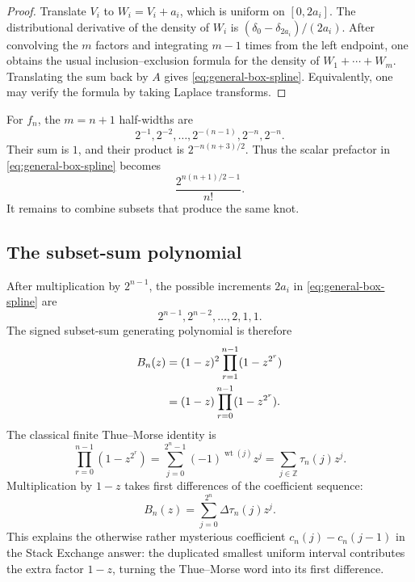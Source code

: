 \documentclass[11pt,oneside]{article}
\theoremstyle{definition}
\theoremstyle{remark}
\newcommand{\wt}{\operatorname{wt}}
\begin{document}
\begin{proof}
Translate $V_i$ to $W_i=V_i+a_i$, which is uniform on $[0,2a_i]$.  The distributional
derivative of the density of $W_i$ is
$(\delta_0-\delta_{2a_i})/(2a_i)$.  After convolving the $m$ factors and integrating
$m-1$ times from the left endpoint, one obtains the usual inclusion--exclusion formula
for the density of $W_1+\cdots+W_m$.  Translating the sum back by $A$ gives
\eqref{eq:general-box-spline}.  Equivalently, one may verify the formula by taking
Laplace transforms.
\end{proof}

For $f_n$, the $m=n+1$ half-widths are
\begin{equation}
 2^{-1},2^{-2},\ldots,2^{-(n-1)},2^{-n},2^{-n}.
 \label{eq:fn-halfwidths}
\end{equation}
Their sum is $1$, and their product is $2^{-n(n+3)/2}$.  Thus the scalar prefactor in
\eqref{eq:general-box-spline} becomes
\begin{equation}
 \frac{2^{n(n+1)/2-1}}{n!}.
 \label{eq:box-prefactor}
\end{equation}
It remains to combine subsets that produce the same knot.

\subsection{The subset-sum polynomial}

After multiplication by $2^{n-1}$, the possible increments $2a_i$ in
\eqref{eq:general-box-spline} are
\begin{equation}
 2^{n-1},2^{n-2},\ldots,2,1,1.
 \label{eq:integer-increments}
\end{equation}
The signed subset-sum generating polynomial is therefore
\begin{align}
 B_n(z)
 &=(1-z)^2\prod_{r=1}^{n-1}(1-z^{2^r}) \notag\\
 &=(1-z)\prod_{r=0}^{n-1}(1-z^{2^r}).
 \label{eq:subset-polynomial}
\end{align}
The classical finite Thue--Morse identity is
\begin{equation}
 \prod_{r=0}^{n-1}(1-z^{2^r})
 =\sum_{j=0}^{2^n-1}(-1)^{\wt(j)}z^j
 =\sum_{j\in\mathbb Z}\tau_n(j)z^j.
 \label{eq:thue-morse-product}
\end{equation}
Multiplication by $1-z$ takes first differences of the coefficient sequence:
\begin{equation}
 B_n(z)=\sum_{j=0}^{2^n}\Delta\tau_n(j)z^j.
 \label{eq:first-difference-generating}
\end{equation}
This explains the otherwise rather mysterious coefficient
$c_n(j)-c_n(j-1)$ in the Stack Exchange answer: the duplicated smallest uniform interval
contributes the extra factor $1-z$, turning the Thue--Morse word into its first difference.
\end{document}
